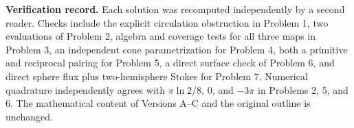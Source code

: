 \documentclass[11pt,letterpaper]{article}
\begin{document}
\textbf{Verification record.}
Each solution was recomputed independently by a second reader. Checks
include the explicit circulation obstruction in Problem 1, two evaluations
of Problem 2, algebra and coverage tests for all three maps in Problem 3,
an independent cone parametrization for Problem 4, both a primitive and
reciprocal pairing for Problem 5, a direct surface check of Problem 6,
and direct sphere flux plus two-hemisphere Stokes for Problem 7.
Numerical quadrature independently agrees with
$\pi\ln2/8$, $0$, and $-3\pi$ in Problems 2, 5, and 6.
The mathematical content of Versions A--C and the original outline is unchanged.
\end{document}
